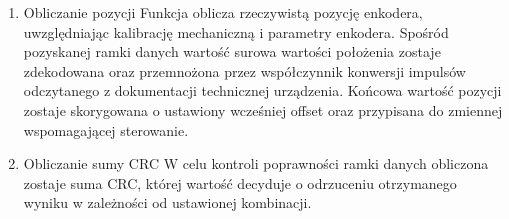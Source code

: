 \begin{enumerate}
\vspace{0.5cm}
    \newpage
    \item Obliczanie pozycji \newline
     Funkcja oblicza rzeczywistą pozycję enkodera, uwzględniając kalibrację mechaniczną i parametry enkodera. Spośród pozyskanej ramki danych wartość surowa wartości położenia zostaje zdekodowana oraz przemnożona przez współczynnik konwersji impulsów odczytanego z dokumentacji technicznej urządzenia. Końcowa wartość pozycji zostaje skorygowana o ustawiony wcześniej offset oraz przypisana do zmiennej wspomagającej sterowanie.

\vspace{0.5cm}

    \item Obliczanie sumy CRC \newline
    W celu kontroli poprawności ramki danych obliczona zostaje suma CRC, której wartość decyduje o odrzuceniu otrzymanego wyniku w zależności od ustawionej kombinacji.    
\end{enumerate}

\newpage

